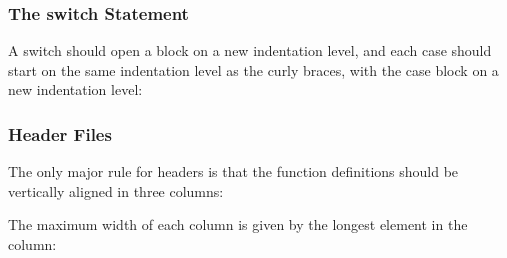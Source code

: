 \subsubsection*{The switch Statement}

A switch should open a block on a new indentation level, and each case should start on the same indentation level as the curly braces, with the case block on a new indentation level\+: 
\begin{DoxyCode}{0}
\DoxyCodeLine{    \textcolor{keywordflow}{break};}
\DoxyCodeLine{    \textcolor{keywordflow}{break};}
\DoxyCodeLine{\}}
\end{DoxyCode}


\subsubsection*{Header Files}

The only major rule for headers is that the function definitions should be vertically aligned in three columns\+:


\begin{DoxyCode}{0}
\end{DoxyCode}


The maximum width of each column is given by the longest element in the column\+: 
\begin{DoxyCode}{0}
\end{DoxyCode}
 